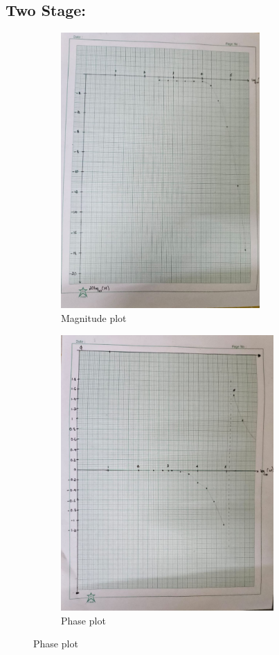 \documentclass[a4paper,12pt]{article}
\begin{document}
\subsection{Two Stage:}
\pagebreak
\begin{figure}[h!]
	\begin{subfigure}[b]{100pt}
		\caption{Magnitude plot}
		\includegraphics[width = 215pt]{figs/fig3.png}
	\end{subfigure}
	\hspace{110pt}
	\begin{subfigure}[b]{100pt}
		\caption{Phase plot}
		\includegraphics[width = 230pt]{figs/fig4.png}
	\end{subfigure}
\end{figure}
\end{document}

